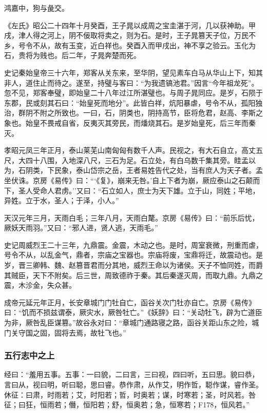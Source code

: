 \documentclass[]{article}
\begin{document}
鸿嘉中，狗与彘交。

《左氏》昭公二十四年十月癸酉，王子晁以成周之宝圭湛于河，几以获神助。甲戌，津人得之河上，阴不佞取将卖之，则为石。是时，王子晁篡天子位，万民不乡，号令不从，故有玉变，近白祥也。癸酉入而甲戌出，神不享之验云。玉化为石，贵将为贱也。后二年，子晁奔楚而死。

史记秦始皇帝三十六年，郑客从关东来，至华阴，望见素车白马从华山上下，知其非人，道住止而待之。遂至，持璧与客曰：``为我遗镐池君。''因言``今年祖龙死''。忽不见，郑客奉璧，即始皇二十八年过江所湛璧也。与周子晁同应。是岁，石陨于东郡，民或刻其石曰：``始皇死而地分''。此皆白祥，炕阳暴虐，号令不从，孤阳独治，群阴不附之所致也。一曰，石，阴类也，阴持高节，臣将危君，赵高、李斯之象也。始皇不畏戒自省，反夷灭其旁民，而燔烧其石。是岁始皇死，后三年而秦灭。

孝昭元凤三年正月，泰山莱芜山南匈匈有数千人声。民视之，有大石自立，高丈五尺，大四十八围，入地深八尺，三石为足。石立处，有白乌数千集其旁。眭孟以为，石阴类，下民象，泰山岱宗之岳，王者易姓告代之处，当有庶人为天子者。孟坐伏诛。京房《易传》曰：```《复》，崩来无咎。'自上下者为崩，厥应泰山之石颠而下，圣人受命人君虏。''又曰：``石立如人，庶士为天下雄。立于山，同姓；平地，异姓。立于水，圣人；于泽，小人。''

天汉元年三月，天雨白毛；三年八月，天雨白氂。京房《易传》曰：``前乐后忧，厥妖天雨羽。''又曰：``邪人进，贤人逃，天雨毛。''

史记周威烈王二十三年，九鼎震。金震，木动之也。是时，周室衰微，刑重而虐，号令不从，以乱金气，鼎者，宗庙之宝器也。宗庙将废，宝鼎将迁，故震动也。是岁，晋三卿韩、魏、赵篡晋君而分其地，威烈王命以为诸侯。天子不恤同姓，而爵其贼臣，天下不附矣。后三世，周致德祚于秦。其后秦遂灭周，而取九鼎。九鼎之震，木沴金，失众甚。

成帝元延元年正月，长安章城门门牡自亡，函谷关次门牡亦自亡。京房《易传》曰：``饥而不损兹谓泰，厥灾水，厥咎牡亡。''《妖辞》曰：``关动牡飞，辟为亡道臣为非，厥咎乱臣谋篡。''故谷永对曰：``章城门通路寝之路，函谷关距山东之险，城门关守国之固，固将去焉，故牡飞也。''

\hypertarget{header-n2147}{%
\subsubsection{五行志中之上}\label{header-n2147}}

经曰：``羞用五事。五事：一曰貌，二曰言，三曰视，四曰听，五曰思。貌曰恭，言曰从，视曰明，听曰聪，思曰睿。恭作肃，从作艾，明作哲，聪作谋，睿作圣。休征：曰肃，时雨若；艾，时阳若；哲，时奥若；谋，时寒若；圣，时风若。咎征；曰狂，恒雨若；僭，恒阳若；舒，恒奥若；急，恒寒若；F178，恒风若。''
\end{document}
